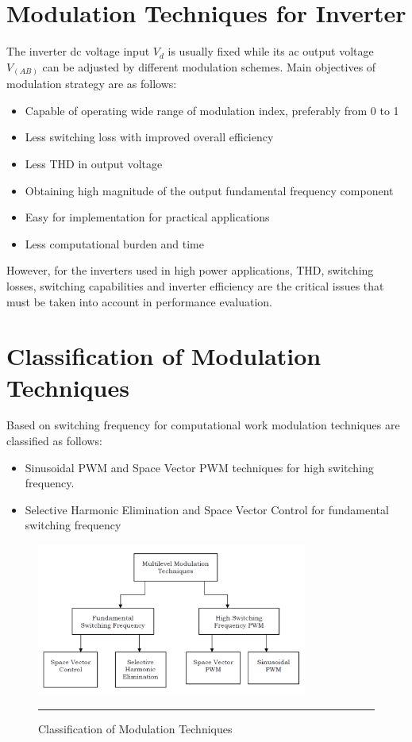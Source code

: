 \section{Modulation Techniques for Inverter}
 The inverter dc voltage input $V_d$ is usually fixed while its ac output voltage $V_(AB)$ can be adjusted by different modulation schemes.
Main objectives of modulation strategy are as follows:
\begin{itemize}
\item Capable of operating wide range of modulation index, preferably
from 0 to 1
\item Less switching loss with improved overall efficiency
\item Less THD in output voltage
\item Obtaining high magnitude of the output fundamental frequency
component
\item Easy for implementation for practical applications
\item Less computational burden and time
\end{itemize}
However, for the inverters used in high power applications,
THD, switching losses, switching capabilities and inverter
efficiency are the critical issues that must be taken into account in
performance evaluation.
\section{Classification of Modulation Techniques}
Based on switching frequency for computational work modulation techniques are classified as follows:
\begin{itemize}
\item Sinusoidal PWM and Space Vector PWM techniques for high switching frequency.
\item Selective Harmonic Elimination and Space Vector Control for fundamental switching frequency
\end{itemize}
\begin{figure}[htbp]
	\centering
		\includegraphics[width = 3.5in]{./Figures/Doc1.pdf}
		\rule{35em}{5pt}
	\caption{Classification of Modulation Techniques}
	\label{fig:9}
\end{figure}
